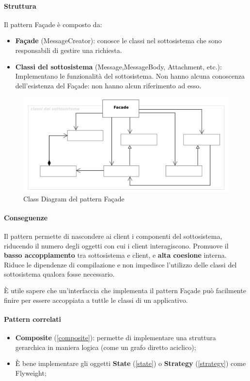 \paragraph{Struttura} Il pattern Façade è composto da:
\begin{itemize}
    \item \textbf{Façade} (MessageCreator): conosce le classi nel sottosistema che sono responsabili di gestire una richiesta.
    \item \textbf{Classi del sottosistema} (Message,MessageBody, Attachment, etc.): Implementano le funzionalità del sottosistema. Non hanno alcuna conoscenza dell’esistenza del Façade: non hanno alcun riferimento ad esso.
\end{itemize}

\begin{figure}[H]
    \centering
    \includegraphics[width=1\linewidth]{assets/pattern/facade/facade-struttura.png}
    \caption{Class Diagram del pattern Façade}
\end{figure}

\paragraph{Conseguenze} Il pattern permette di nascondere ai client i componenti del sottosistema, riducendo il numero degli oggetti con cui i client interagiscono. Promuove il \textbf{basso accoppiamento} tra sottosistema e client, e \textbf{alta coesione} interna. Riduce le dipendenze di compilazione e non impedisce l'utilizzo delle classi del sottosistema qualora fosse necessario.

È utile sapere che un'interfaccia che implementa il pattern Façade può facilmente finire per essere accoppiata a tuttle le classi di un applicativo.

\paragraph{Pattern correlati}
\begin{itemize}
    \item \textbf{Composite} (\ref{composite}): permette di implementare una struttura gerarchica in maniera logica (come un grafo diretto aciclico);
    \item È bene implementare gli oggetti \textbf{State} (\ref{state}) o \textbf{Strategy} (\ref{strategy}) come Flyweight;
\end{itemize}

\newpage
